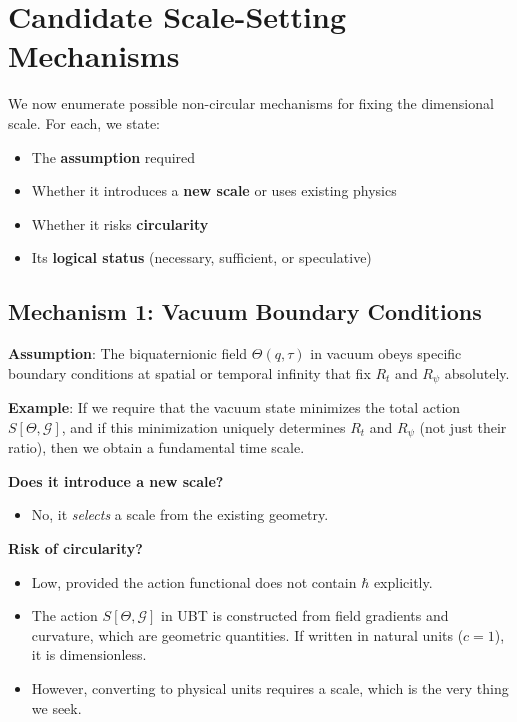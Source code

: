 \documentclass[12pt]{article}
\begin{document}
\section{Candidate Scale-Setting Mechanisms}

We now enumerate possible non-circular mechanisms for fixing the dimensional scale. For each, we state:
\begin{itemize}
\item The \textbf{assumption} required
\item Whether it introduces a \textbf{new scale} or uses existing physics
\item Whether it risks \textbf{circularity}
\item Its \textbf{logical status} (necessary, sufficient, or speculative)
\end{itemize}

\subsection{Mechanism 1: Vacuum Boundary Conditions}

\textbf{Assumption}: The biquaternionic field $\Theta(q,\tau)$ in vacuum obeys specific boundary conditions at spatial or temporal infinity that fix $R_t$ and $R_\psi$ absolutely.

\textbf{Example}: If we require that the vacuum state minimizes the total action $S[\Theta, \mathcal{G}]$, and if this minimization uniquely determines $R_t$ and $R_\psi$ (not just their ratio), then we obtain a fundamental time scale.

\textbf{Does it introduce a new scale?}
\begin{itemize}
\item No, it \emph{selects} a scale from the existing geometry.
\end{itemize}

\textbf{Risk of circularity?}
\begin{itemize}
\item Low, provided the action functional does not contain $\hbar$ explicitly.
\item The action $S[\Theta, \mathcal{G}]$ in UBT is constructed from field gradients and curvature, which are geometric quantities. If written in natural units ($c = 1$), it is dimensionless.
\item However, converting to physical units requires a scale, which is the very thing we seek.
\end{itemize}
\end{document}
